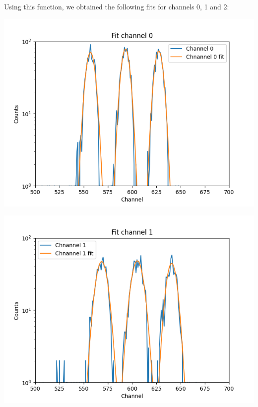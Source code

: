 \documentclass{article}
\begin{document}
\begin{multicols}{2}
Using this function, we obtained the following fits for channels 0, 1 and 2:

\begin{center}
    \label{TT_21}
    \centering
    \includegraphics[scale = 0.6]{images/TT_21_Chn0.png}
\end{center}

\begin{center}
    \label{TT_21}
    \centering
    \includegraphics[scale = 0.6]{images/TT_21_Chn1.png}
\end{center}


\end{multicols}
\end{document}
